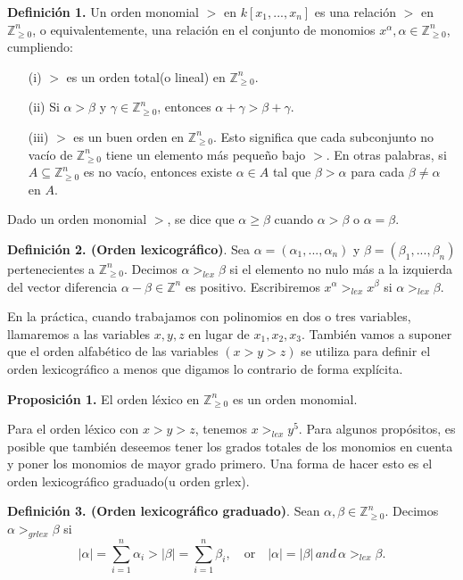 \textbf{Definición 1.} Un orden monomial $>$ en $k[x_{1},..., x _{n}]$ es una relación $>$ en $\mathbb{Z}^{n}_{\geq0}$, o equivalentemente, una relación en el conjunto de monomios $x^{\alpha}, \alpha \in  \mathbb{Z}^{n}_{\geq0}$, cumpliendo:
\begin{enumerate}
	\item [(i)] $>$ es un orden total(o lineal) en $\mathbb{Z}^{n}_{\geq0}$.
	\item [(ii)] Si $\alpha > \beta$ y $\gamma \in \mathbb{Z}^{n}_{\geq0}$, entonces $\alpha + \gamma > \beta + \gamma$.
	\item [(iii)] $>$ es un buen orden en $\mathbb{Z}^{n}_{\geq0}$. Esto significa que cada subconjunto no vacío de $\mathbb{Z}^{n}_{\geq0}$ tiene un elemento más pequeño bajo $>$. En otras palabras, si $A \subseteq \mathbb{Z}^{n}_{\geq0}$ es no vacío, entonces existe $\alpha \in A$ tal que $\beta > \alpha$ para cada $\beta \neq \alpha$ en $A$.
\end{enumerate}

Dado un orden monomial $>$, se dice que $\alpha \geq \beta$ cuando $\alpha > \beta$ o $\alpha = \beta$.

\textbf{Definición 2. (Orden lexicográfico)}. Sea $\alpha = (\alpha_{1},...,\alpha_{n})$ y $\beta = (\beta_{1},...,\beta_{n})$ pertenecientes a $\mathbb{Z}^{n}_{\geq0}$. Decimos $\alpha >_{lex} \beta$ si el elemento no nulo más a la izquierda del vector diferencia $\alpha - \beta \in \mathbb{Z}^{n}$ es positivo. Escribiremos $x^{\alpha}>_{lex}x^{\beta}$ si $\alpha >_{lex} \beta$.

En la práctica, cuando trabajamos con polinomios en dos o tres variables, llamaremos a las variables $x, y, z$ en lugar de $x_{1}, x_{2}, x_{3}$. También vamos a suponer que el orden alfabético de las variables $(x> y> z)$ se utiliza para definir el orden lexicográfico
a menos que digamos lo contrario de forma explícita.

\textbf{Proposición 1.} El orden léxico en $\mathbb{Z}^{n}_{\geq0}$ es un orden monomial.

Para el orden léxico con $x> y> z$, tenemos $x >_{lex} y^{5}$. Para algunos propósitos, es posible que también deseemos tener los grados totales de los monomios en cuenta y poner los monomios de mayor grado primero.
Una forma de hacer esto es el orden lexicográfico graduado(u orden grlex).

\textbf{Definición 3. (Orden lexicográfico graduado)}. Sean $\alpha,\beta \in \mathbb{Z}^{n}_{\geq0}$. Decimos $\alpha >_{grlex} \beta$ si 
\[
|\alpha| = \sum_{i=1}^{n}\alpha_{i} > |\beta| = \sum_{i=1}^{n}\beta_{i}, \quad \mbox{or} \quad|\alpha| = |\beta|\, and \, \alpha>_{lex}\beta.
\]

